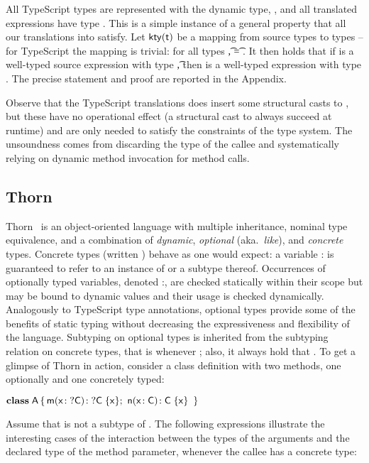 \documentclass[acmlarge, anonymous, authordraft]{acmart}
\begin{document}
\noindent  All TypeScript types are represented with the dynamic \kafka type, \any, and all translated expressions have type \any.  This is a simple instance of a general property that all our translations into \kafka satisfy.  Let \(\kty\t\) be a mapping from source types to \kafka types -- for TypeScript the mapping is trivial: for all types \t, \kty\t = \src{\any}.  It then holds that if \e is a well-typed source expression with type \t, then \TR{\e} is a well-typed \kafka expression with type \kty{\t}.  The precise statement and proof are reported in the Appendix.

Observe that the TypeScript translations does insert some structural casts to \any, but these have no operational effect (a structural cast to \any always succeed at runtime) and are only needed to satisfy the constraints of the \kafka type system.  The unsoundness comes from discarding the type of the callee and systematically relying on  dynamic method invocation for method calls.


\subsection{Thorn}

Thorn~\cite{oopsla09} is an object-oriented language with multiple inheritance,
nominal type equivalence, and a combination of \emph{dynamic}, \emph{optional} (aka.~\emph{like}), and \emph{concrete} types.  Concrete types (written \C) behave as one would expect: a variable {\x:\C} is
guaranteed to refer to an instance of \C or a subtype thereof.  Occurrences of optionally typed variables, denoted {\x:\dt\C}, are checked statically within their scope but may be bound to dynamic values and their usage is checked dynamically.  Analogously to TypeScript type annotations, optional types provide some of the benefits of static typing without decreasing the expressiveness and flexibility of the language.  Subtyping on optional types is inherited from the subtyping relation on concrete types, that is {\dt\C} \Sub {\dt\D} whenever \C \Sub \D; also, it always hold that \C \Sub  \dt\C. To get a glimpse of Thorn in action, consider a class definition with two methods, one optionally and one concretely typed:

\medskip
\(
 \Class \A {
    \Mdef \m\x{\dt\C} {\dt\C}  \x  ; \ 
    \Mdef \n\x\C\C  \x 
    }
\)
\medskip

\noindent Assume that \D is not a subtype of \C.  The following expressions illustrate the interesting cases of the interaction between the types of the arguments and the declared type of the method parameter, whenever the callee has a concrete type:
\end{document}
